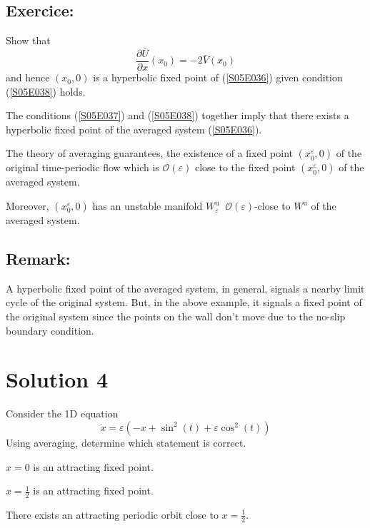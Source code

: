 \documentclass[twoside,10pt,a4paper]{article}
\begin{document}
\subsection*{Exercice:}
Show that
\begin{equation*}
	\frac{\partial \bar{U}}{\partial x}(x_0) = -2 \bar{V}(x_0)
\end{equation*}
and hence $(x_0,0)$ is a hyperbolic fixed point of (\ref{S05E036}) given condition (\ref{S05E038}) holds.

The conditions (\ref{S05E037}) and (\ref{S05E038}) together imply that there exists a hyperbolic fixed point of the averaged system (\ref{S05E036}).

The theory of averaging guarantees, the existence of a fixed point $(x_0^\varepsilon,0)$ of the original time-periodic flow which is $\mathcal{O}(\varepsilon)$ close to the fixed point $(x_0^\varepsilon,0)$ of the averaged system.

Moreover, $(x_0^\varepsilon,0)$ has an unstable manifold $W_\varepsilon^{\text{u}} \;\; \mathcal{O}(\varepsilon)$-close to $W^{\text{u}}$ of the averaged system.

\subsection*{Remark:}
A hyperbolic fixed point of the averaged system, in general, signals a nearby limit cycle of the original system. But, in the above example, it signals a fixed point of the original system since the points on the wall don't move due to the no-slip boundary condition.


\newpage

\section*{Solution 4}
Consider the 1D equation
\begin{equation*}
	\dot{x} = \varepsilon (-x + \sin^2(t) + \varepsilon \cos^2(t))
\end{equation*}
Using averaging, determine which statement is correct.

\begin{enumerate}[label=(\alph*)]
	\item $x = 0$ is an attracting fixed point.
	\item $\displaystyle x = \frac{1}{2}$ is an attracting fixed point.
	{\color{MyRed}\item There exists an attracting periodic orbit close to $\displaystyle x = \frac{1}{2}$.}
\end{enumerate}
\end{document}
